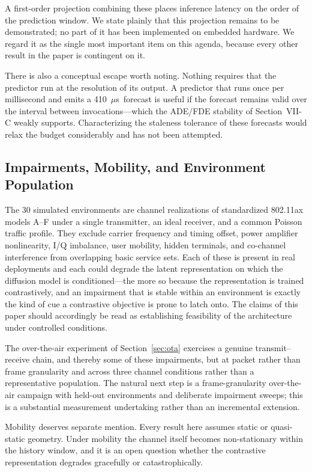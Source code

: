 \documentclass[lettersize,journal]{IEEEtran}
\newcommand{\us}{\ensuremath{\mu}s}
\begin{document}
A first-order projection combining these places inference latency on the
order of the prediction window. We state plainly that this projection
remains to be demonstrated; no part of it has been implemented on
embedded hardware. We regard it as the single most important item on
this agenda, because every other result in the paper is contingent on
it.

There is also a conceptual escape worth noting. Nothing requires that
the predictor run at the resolution of its output. A predictor that runs
once per millisecond and emits a 410~\us\ forecast is useful if the
forecast remains valid over the interval between invocations---which the
ADE/FDE stability of Section~VII-C weakly supports. Characterizing the
staleness tolerance of these forecasts would relax the budget
considerably and has not been attempted.

\subsection{Impairments, Mobility, and Environment Population}
The 30 simulated environments are channel realizations of standardized
802.11ax models A--F under a single transmitter, an ideal receiver, and
a common Poisson traffic profile. They exclude carrier frequency and
timing offset, power amplifier nonlinearity, I/Q imbalance, user
mobility, hidden terminals, and co-channel interference from overlapping
basic service sets. Each of these is present in real deployments and each
could degrade the latent representation on which the diffusion model is
conditioned---the more so because the representation is trained
contrastively, and an impairment that is stable within an environment is
exactly the kind of cue a contrastive objective is prone to latch onto.
The claims of this paper should accordingly be read as establishing
feasibility of the architecture under controlled conditions.

The over-the-air experiment of Section~\ref{sec:ota} exercises a genuine
transmit--receive chain, and thereby some of these impairments, but at
packet rather than frame granularity and across three channel conditions
rather than a representative population. The natural next step is a
frame-granularity over-the-air campaign with held-out environments and
deliberate impairment sweeps; this is a substantial measurement
undertaking rather than an incremental extension.

Mobility deserves separate mention. Every result here assumes static or
quasi-static geometry. Under mobility the channel itself becomes
non-stationary within the history window, and it is an open question
whether the contrastive representation degrades gracefully or
catastrophically.
\end{document}
